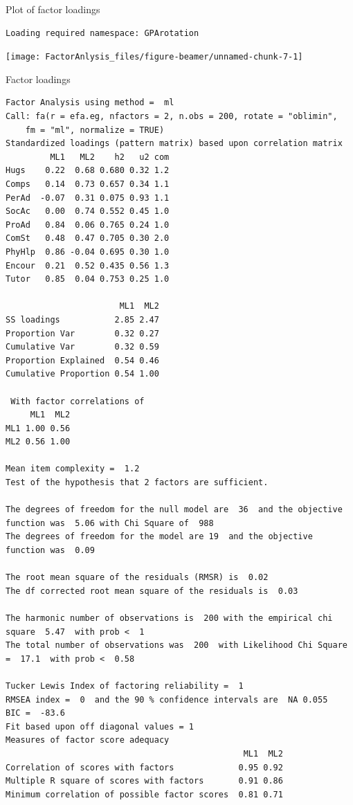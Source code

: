 \documentclass[10pt,ignorenonframetext,]{beamer}
\begin{document}
\begin{frame}[fragile]{Plot of factor loadings}

\begin{verbatim}
Loading required namespace: GPArotation
\end{verbatim}

\texttt{[image: FactorAnlysis\_files/figure-beamer/unnamed-chunk-7-1]}

\end{frame}

\begin{frame}[fragile]{Factor loadings}

\tiny

\begin{verbatim}
Factor Analysis using method =  ml
Call: fa(r = efa.eg, nfactors = 2, n.obs = 200, rotate = "oblimin", 
    fm = "ml", normalize = TRUE)
Standardized loadings (pattern matrix) based upon correlation matrix
         ML1   ML2    h2   u2 com
Hugs    0.22  0.68 0.680 0.32 1.2
Comps   0.14  0.73 0.657 0.34 1.1
PerAd  -0.07  0.31 0.075 0.93 1.1
SocAc   0.00  0.74 0.552 0.45 1.0
ProAd   0.84  0.06 0.765 0.24 1.0
ComSt   0.48  0.47 0.705 0.30 2.0
PhyHlp  0.86 -0.04 0.695 0.30 1.0
Encour  0.21  0.52 0.435 0.56 1.3
Tutor   0.85  0.04 0.753 0.25 1.0

                       ML1  ML2
SS loadings           2.85 2.47
Proportion Var        0.32 0.27
Cumulative Var        0.32 0.59
Proportion Explained  0.54 0.46
Cumulative Proportion 0.54 1.00

 With factor correlations of 
     ML1  ML2
ML1 1.00 0.56
ML2 0.56 1.00

Mean item complexity =  1.2
Test of the hypothesis that 2 factors are sufficient.

The degrees of freedom for the null model are  36  and the objective function was  5.06 with Chi Square of  988
The degrees of freedom for the model are 19  and the objective function was  0.09 

The root mean square of the residuals (RMSR) is  0.02 
The df corrected root mean square of the residuals is  0.03 

The harmonic number of observations is  200 with the empirical chi square  5.47  with prob <  1 
The total number of observations was  200  with Likelihood Chi Square =  17.1  with prob <  0.58 

Tucker Lewis Index of factoring reliability =  1
RMSEA index =  0  and the 90 % confidence intervals are  NA 0.055
BIC =  -83.6
Fit based upon off diagonal values = 1
Measures of factor score adequacy             
                                                ML1  ML2
Correlation of scores with factors             0.95 0.92
Multiple R square of scores with factors       0.91 0.86
Minimum correlation of possible factor scores  0.81 0.71
\end{verbatim}

\end{frame}
\end{document}
